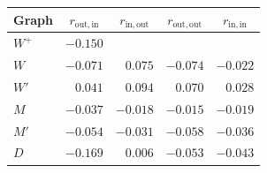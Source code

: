 \begin{tabular}{lrrrr}
\hline
Graph & \multicolumn{1}{c}{$r_\mathrm{out,in}$} & \multicolumn{1}{c}{$r_\mathrm{in,out}$} & \multicolumn{1}{c}{$r_\mathrm{out,out}$} & \multicolumn{1}{c}{$r_\mathrm{in,in}$} \\
\hline
$W^+$ & $-0.150$ & & & \\
\hline
$W$ & $-0.071$ & $0.075$ & $-0.074$ & $-0.022$ \\
$W'$ & $0.041$ & $0.094$ & $0.070$ & $0.028$ \\
$M$ & $-0.037$ & $-0.018$ & $-0.015$ & $-0.019$ \\
$M'$ & $-0.054$ & $-0.031$ & $-0.058$ & $-0.036$ \\
$D$ & $-0.169$ & $0.006$ & $-0.053$ & $-0.043$ \\
\hline
\end{tabular}
